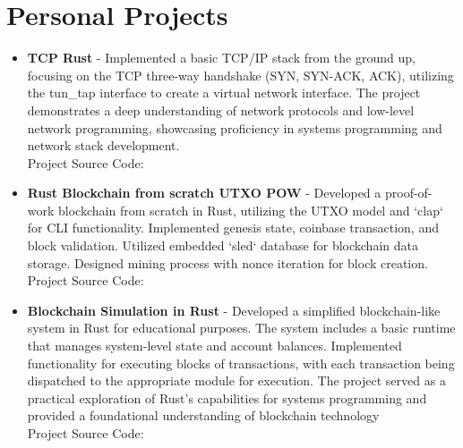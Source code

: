 \documentclass[11pt,a4paper,sans]{moderncv}
\begin{document}
\section{Personal Projects}
\begin{itemize}[label=\textbullet]
	\item \textbf{TCP Rust} - Implemented a basic TCP/IP stack from the ground up, focusing on the TCP three-way handshake (SYN, SYN-ACK, ACK), utilizing the tun\_tap interface to create a virtual network interface. The project demonstrates a deep understanding of network protocols and low-level network programming, showcasing proficiency in systems programming and network stack development. \\
	      Project Source Code: \textcolor{blue}{\href{https://github.com/noormohammedb/rust-tcp-implementation/}{}}

	\item \textbf{Rust Blockchain from scratch UTXO POW} - Developed a proof-of-work blockchain from scratch in Rust, utilizing the UTXO model and `clap` for CLI functionality. Implemented genesis state, coinbase transaction, and block validation. Utilized embedded `sled` database for blockchain data storage. Designed mining process with nonce iteration for block creation. \\
	      Project Source Code: \textcolor{blue}{\href{https://github.com/noormohammedb/blockchain-pow-from-scratch-rust-utxo/}{}}


	\item \textbf{Blockchain Simulation in Rust} - Developed a simplified blockchain-like system in Rust for educational purposes. The system includes a basic runtime that manages system-level state and account balances. Implemented functionality for executing blocks of transactions, with each transaction being dispatched to the appropriate module for execution. The project served as a practical exploration of Rust’s capabilities for systems programming and provided a foundational understanding of blockchain technology  \\
	      Project Source Code: \textcolor{blue}{\href{https://github.com/noormohammedb/rust-state-machine/}{}}

\end{itemize}
\end{document}
